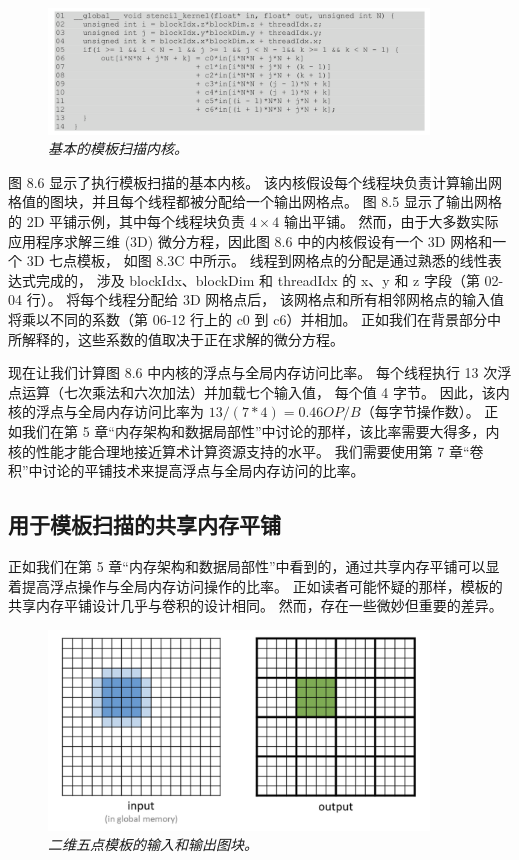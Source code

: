 \begin{figure}[H]
	\centering
	\includegraphics[width=0.9\textwidth]{figs/F8.6.png}
	\caption{\textit{基本的模板扫描内核。}}
\end{figure}

图 8.6 显示了执行模板扫描的基本内核。 该内核假设每个线程块负责计算输出网格值的图块，并且每个线程都被分配给一个输出网格点。 
图 8.5 显示了输出网格的 2D 平铺示例，其中每个线程块负责 $4 \times 4$ 输出平铺。 
然而，由于大多数实际应用程序求解三维 (3D) 微分方程，因此图 8.6 中的内核假设有一个 3D 网格和一个 3D 七点模板，
如图 8.3C 中所示。 线程到网格点的分配是通过熟悉的线性表达式完成的，
涉及 blockIdx、blockDim 和 threadIdx 的 x、y 和 z 字段（第 02-04 行）。 将每个线程分配给 3D 网格点后，
该网格点和所有相邻网格点的输入值将乘以不同的系数（第 06-12 行上的 c0 到 c6）并相加。 
正如我们在背景部分中所解释的，这些系数的值取决于正在求解的微分方程。

现在让我们计算图 8.6 中内核的浮点与全局内存访问比率。 每个线程执行 13 次浮点运算（七次乘法和六次加法）并加载七个输入值，
每个值 4 字节。 因此，该内核的浮点与全局内存访问比率为 $13/(7 * 4) = 0.46 OP/B$（每字节操作数）。 
正如我们在第 5 章“内存架构和数据局部性”中讨论的那样，该比率需要大得多，内核的性能才能合理地接近算术计算资源支持的水平。 
我们需要使用第 7 章“卷积”中讨论的平铺技术来提高浮点与全局内存访问的比率。

\subsection{用于模板扫描的共享内存平铺}
正如我们在第 5 章“内存架构和数据局部性”中看到的，通过共享内存平铺可以显着提高浮点操作与全局内存访问操作的比率。 
正如读者可能怀疑的那样，模板的共享内存平铺设计几乎与卷积的设计相同。 然而，存在一些微妙但重要的差异。

\begin{figure}[H]
	\centering
	\includegraphics[width=0.9\textwidth]{figs/F8.7.png}
	\caption{\textit{二维五点模板的输入和输出图块。}}
\end{figure}

